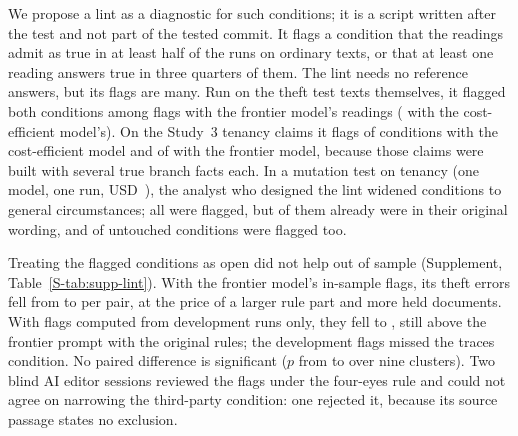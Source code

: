 We propose a lint as a diagnostic for such conditions; it is a script written after the test and not part of the tested commit. It flags a condition that the readings admit as true in at least half of the runs on ordinary texts, or that at least one reading answers true in three quarters of them. The lint needs no reference answers, but its flags are many. Run on the theft test texts themselves, it flagged both conditions among \spostInSampleFlagsTerraN{} flags with the frontier model's readings (\spostInSampleFlagsLunaN{} with the cost-efficient model's). On the Study~3 tenancy claims it flags \spostTenLintLunaFlagged{} of \spostTenLintLunaConditions{} conditions with the cost-efficient model and \spostTenLintTerraFlagged{} of \spostTenLintTerraConditions{} with the frontier model, because those claims were built with several true branch facts each. In a mutation test on tenancy (one model, one run, USD~\spostMutSpendUSD), the analyst who designed the lint widened \spostMutPlanted{} conditions to general circumstances; all were flagged, but \spostMutPlantedAlready{} of them already were in their original wording, and \spostMutFalseAlarmMutated{} of \spostMutUnmutated{} untouched conditions were flagged too.

Treating the flagged conditions as open did not help out of sample (Supplement, Table~\ref{S-tab:supp-lint}). With the frontier model's in-sample flags, its theft errors fell from \spostHeldTerraTestedErrors{} to \spostHeldTerraFlagOpenErrors{} per pair, at the price of a larger rule part and more held documents. With flags computed from development runs only, they fell to \spostHeldTerraDevFlagOpenErrors, still above the frontier prompt with the original rules; the development flags missed the traces condition. No paired difference is significant ($p$ from \spostPairedFlagOpenRicFrontierP{} to \spostPairedTestedRicFrontierP{} over nine clusters). Two blind AI editor sessions reviewed the flags under the four-eyes rule and could not agree on narrowing the third-party condition: one rejected it, because its source passage states no exclusion.
